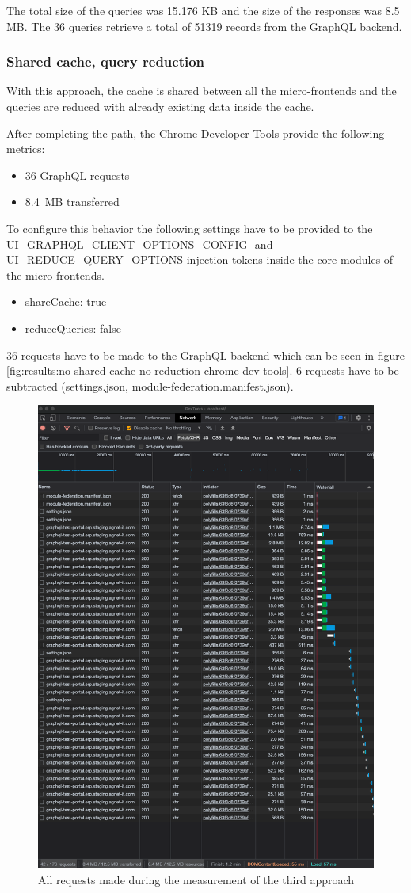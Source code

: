 The total size of the queries was 15.176 KB and the size of the responses was 8.5 MB. The 36 queries retrieve a total of 51319 records from the GraphQL backend.

\subsubsection{Shared cache, query reduction}

With this approach, the cache is shared between all the micro-frontends and the queries are reduced with already existing data inside the cache.

After completing the path, the Chrome Developer Tools provide the following metrics:

\begin{itemize}
    \item 36 GraphQL requests
    \item 8.4 MB transferred
\end{itemize}

 To configure this behavior the following settings have to be provided to the UI\_GRAPHQL\_CLIENT\_OPTIONS\_CONFIG- and UI\_REDUCE\_QUERY\_OPTIONS injection-tokens inside the core-modules of the micro-frontends.

\begin{itemize}
    \item shareCache: true
    \item reduceQueries: false
\end{itemize}

36 requests have to be made to the GraphQL backend which can be seen in figure \ref{fig:results:no-shared-cache-no-reduction-chrome-dev-tools}. 6 requests have to be subtracted (settings.json, module-federation.manifest.json).

\ifshowImages
\begin{figure}[H]
\centering
\includegraphics[width=0.6\linewidth]{images/1-attempt/shared-reduced-cache.png}
\caption{All requests made during the measurement of the third approach}\label{fig:results:shared-cache-reduction-chrome-dev-tools}
\end{figure}
\fi

